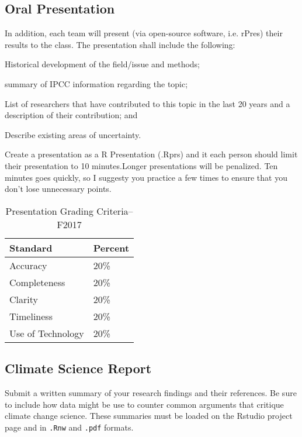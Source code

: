 \documentclass{article}\usepackage[]{graphicx}\usepackage[]{color}
\newenvironment{itemize*}%
  {\begin{itemize}%
    \setlength{\itemsep}{0pt}%
    \setlength{\parskip}{0pt}}%
  {\end{itemize}}
\begin{document}
\subsection{Oral Presentation}

In addition, each team will present (via open-source software, i.e. rPres) their results to the class. The presentation shall include the following:

\begin{itemize*}
  \item Historical development of the field/issue and methods;
  \item summary of IPCC information regarding the topic;
  \item List of researchers that have contributed to this topic in the last 20 years and a description of their contribution; and
  \item Describe existing areas of uncertainty.
\end{itemize*}

Create a presentation as a R Presentation (.Rprs) and it each person should limit their presentation to 10 minutes.Longer presentations will be penalized. Ten minutes goes quickly, so I suggesty you practice a few times to ensure that you don't lose unnecessary points. 

\begin{table}[h]
\centering
\caption{Presentation Grading Criteria--F2017}
\label{tab:presentationgrading}
\begin{tabular}{ll}\hline
Standard            & Percent \\ \hline\hline    
Accuracy            & 20\%  \\
Completeness        & 20\% \\
Clarity             & 20\% \\
Timeliness          & 20\% \\
Use of Technology   & 20\% \\ \hline
\end{tabular}
\end{table}

\subsection{Climate Science Report}

Submit a written summary of your research findings and their references. Be sure to include how data might be use to counter common arguments that critique climate change science. These summaries must be loaded on the Rstudio project page and in \texttt{.Rnw} and \texttt{.pdf} formats. 
\end{document}
